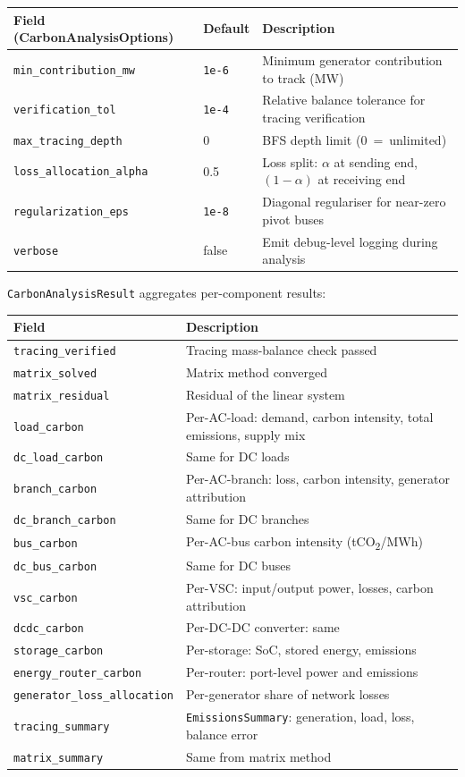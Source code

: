 \begin{center}
\begin{tabular}{lll}
\hline\hline
\textbf{Field (CarbonAnalysisOptions)} & \textbf{Default} & \textbf{Description} \\
\hline
\texttt{min\_contribution\_mw} & \texttt{1e-6} & Minimum generator contribution to track (MW) \\
\texttt{verification\_tol} & \texttt{1e-4} & Relative balance tolerance for tracing verification \\
\texttt{max\_tracing\_depth} & 0 & BFS depth limit (0~=~unlimited) \\
\texttt{loss\_allocation\_alpha} & 0.5 & Loss split: $\alpha$ at sending end, $(1-\alpha)$ at receiving end \\
\texttt{regularization\_eps} & \texttt{1e-8} & Diagonal regulariser for near-zero pivot buses \\
\texttt{verbose} & false & Emit debug-level logging during analysis \\
\hline\hline
\end{tabular}
\end{center}

\texttt{CarbonAnalysisResult} aggregates per-component results:

\begin{longtable}{ll}
\hline\hline
\textbf{Field} & \textbf{Description} \\
\hline\endhead\hline\endfoot
\texttt{tracing\_verified} & Tracing mass-balance check passed \\
\texttt{matrix\_solved} & Matrix method converged \\
\texttt{matrix\_residual} & Residual of the linear system \\
\texttt{load\_carbon} & Per-AC-load: demand, carbon intensity, total emissions, supply mix \\
\texttt{dc\_load\_carbon} & Same for DC loads \\
\texttt{branch\_carbon} & Per-AC-branch: loss, carbon intensity, generator attribution \\
\texttt{dc\_branch\_carbon} & Same for DC branches \\
\texttt{bus\_carbon} & Per-AC-bus carbon intensity (tCO\textsubscript{2}/MWh) \\
\texttt{dc\_bus\_carbon} & Same for DC buses \\
\texttt{vsc\_carbon} & Per-VSC: input/output power, losses, carbon attribution \\
\texttt{dcdc\_carbon} & Per-DC-DC converter: same \\
\texttt{storage\_carbon} & Per-storage: SoC, stored energy, emissions \\
\texttt{energy\_router\_carbon} & Per-router: port-level power and emissions \\
\texttt{generator\_loss\_allocation} & Per-generator share of network losses \\
\texttt{tracing\_summary} & \texttt{EmissionsSummary}: generation, load, loss, balance error \\
\texttt{matrix\_summary} & Same from matrix method \\
\end{longtable}

